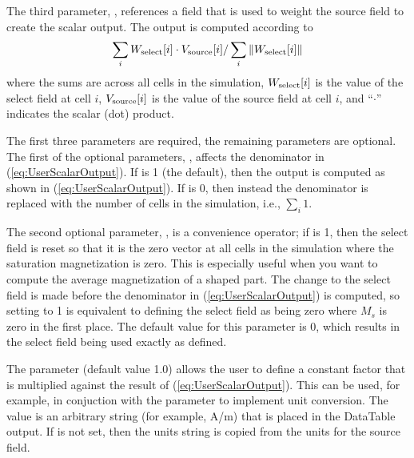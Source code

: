 The third parameter, , references a field that
is used to weight the source field to create the scalar output.  The
output is computed according to
\begin{equation}
\sum_i W_{\rm select}[i]\cdot V_{\rm source}[i]
/\sum_i \|W_{\rm select}[i]\|
\label{eq:UserScalarOutput}
\end{equation}
where the sums are across all cells in the simulation, $W_{\rm
select}[i]$ is the value of the select field at cell $i$,
$V_{\rm source}[i]$ is the value of the source field at cell $i$,
and ``$\cdot$'' indicates the scalar (dot) product.

The first three parameters are required, the remaining parameters are
optional.  The first of the optional parameters, ,
affects the denominator in (\ref{eq:UserScalarOutput}).  If
 is 1 (the default), then the output is computed
as shown in (\ref{eq:UserScalarOutput}).  If  is 0,
then instead the denominator is replaced with the number of cells in the
simulation, i.e., $\sum_i 1$.

The second optional parameter, , is a
convenience operator; if  is 1, then the select field
is reset so that it is the zero vector at all cells in the simulation
where the saturation magnetization is zero.  This is especially useful
when you want to compute the average magnetization of a shaped part.
The change to the select field is made before the denominator in
(\ref{eq:UserScalarOutput}) is computed, so setting
 to 1 is equivalent to defining the select
field as being zero where $M_s$ is zero in the first place.  The default
value for this parameter is 0, which results in the select field being
used exactly as defined.

The  parameter (default value 1.0) allows the
user to define a constant factor that is multiplied against the result
of (\ref{eq:UserScalarOutput}).  This can be used, for example, in
conjuction with the  parameter to implement unit
conversion.  The  value is an arbitrary string (for
example, A/m) that is placed in the DataTable output.  If 
is not set, then the units string is copied from the units for the
source field.

